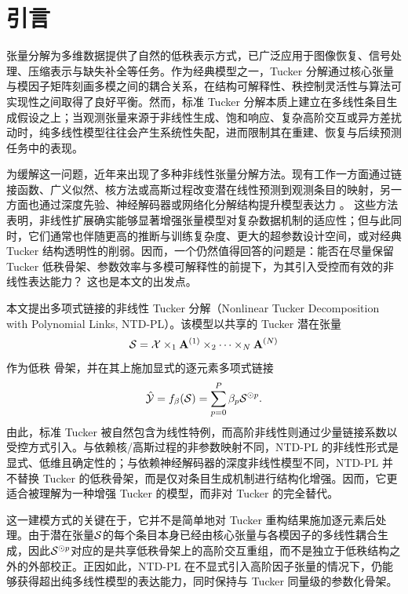 \section{引言}

张量分解为多维数据提供了自然的低秩表示方式，已广泛应用于图像恢复、信号处理、压缩表示与缺失补全等任务\cite{Kolda2009Tensor,DeLathauwer2000MLSVD,Cichocki2015SignalProcessing,Sidiropoulos2017TSP,Liu2013TensorCompletion}。作为经典模型之一，Tucker 分解通过核心张量与模因子矩阵刻画多模之间的耦合关系，在结构可解释性、秩控制灵活性与算法可实现性之间取得了良好平衡\cite{tucker1966some, de2000multilinear, kolda2009tensor}。然而，标准 Tucker 分解本质上建立在多线性条目生成假设之上；当观测张量来源于非线性生成、饱和响应、复杂高阶交互或异方差扰动时，纯多线性模型往往会产生系统性失配，进而限制其在重建、恢复与后续预测任务中的表现。

为缓解这一问题，近年来出现了多种非线性张量分解方法。现有工作一方面通过链接函数、广义似然、核方法或高斯过程改变潜在线性预测到观测条目的映射，另一方面也通过深度先验、神经解码器或网络化分解结构提升模型表达力 \cite{hong2020generalized, xu2011infinite, saragadam2024deeptensor, varolgunes2023nmtucker, zhai2024quadratic}。 这些方法表明，非线性扩展确实能够显著增强张量模型对复杂数据机制的适应性；但与此同时，它们通常也伴随更高的推断与训练复杂度、更大的超参数设计空间，或对经典 Tucker 结构透明性的削弱。因而，一个仍然值得回答的问题是：能否在尽量保留 Tucker 低秩骨架、参数效率与多模可解释性的前提下，为其引入受控而有效的非线性表达能力？ 这也是本文的出发点。

本文提出多项式链接的非线性 Tucker 分解（Nonlinear Tucker Decomposition with Polynomial Links, NTD-PL）。该模型以共享的 Tucker 潜在张量
\[
\mathcal{S} = \mathcal{X} \times_1 \mathbf{A}^{(1)} \times_2 \cdots \times_N \mathbf{A}^{(N)}
\]
作为低秩 骨架，并在其上施加显式的逐元素多项式链接
\[
\hat{\mathcal{Y}} = f_{\beta}(\mathcal{S}) = \sum_{p=0}^{P} \beta_p \mathcal{S}^{\odot p}.
\]
由此，标准 Tucker 被自然包含为线性特例，而高阶非线性则通过少量链接系数以受控方式引入。与依赖核/高斯过程的非参数映射不同，NTD-PL 的非线性形式是显式、低维且确定性的；与依赖神经解码器的深度非线性模型不同，NTD-PL 并不替换 Tucker 的低秩骨架，而是仅对条目生成机制进行结构化增强。因而，它更适合被理解为一种增强 Tucker 的模型，而非对 Tucker 的完全替代。

这一建模方式的关键在于，它并不是简单地对 Tucker 重构结果施加逐元素后处理。由于潜在张量$\mathcal{S}$的每个条目本身已经由核心张量与各模因子的多线性耦合生成，因此$\mathcal{S}^{\odot p}$对应的是共享低秩骨架上的高阶交互重组，而不是独立于低秩结构之外的外部校正。正因如此，NTD-PL 在不显式引入高阶因子张量的情况下，仍能够获得超出纯多线性模型的表达能力，同时保持与 Tucker 同量级的参数化骨架。

